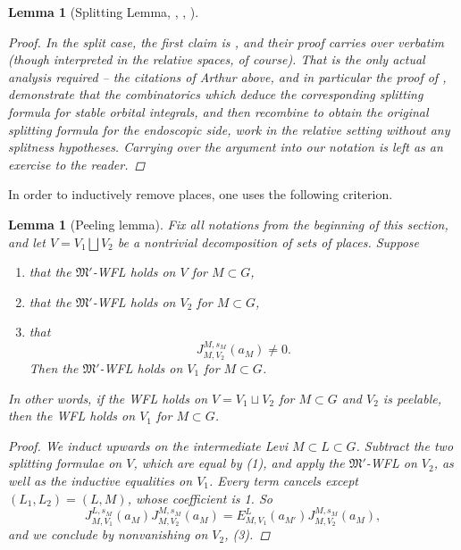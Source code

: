\documentclass[openany]{amsbook}
\newtheorem{lemma}[theorem]{Lemma}
\theoremstyle{definition}
\theoremstyle{remark}
\numberwithin{equation}{section}
\renewcommand{\-}{\operatorname{-}}
\newcommand{\fM}{\mathfrak{M}}
\begin{document}
\begin{lemma}[{Splitting Lemma, \cite{arthurinvlocal}, \cite{arthurtransferwoi}, \cite[Proposition 16.4.1,17.4.1]{CLII}}]
\begin{proof}
        In the split case, the first claim is \cite[17.4.1]{CLII}, and their proof carries over verbatim (though interpreted in the relative spaces, of course). That is the only actual analysis required -- the citations of Arthur above, and in particular the proof of \cite[Theorem 6.1]{arthurtransferwoi}, demonstrate that the combinatorics which deduce the corresponding splitting formula for stable orbital integrals, and then recombine to obtain the original splitting formula for the endoscopic side, work in the relative setting without any splitness hypotheses. Carrying over the argument into our notation is left as an exercise to the reader.
    \end{proof}
\end{lemma}

In order to inductively remove places, one uses the following criterion.

\begin{lemma}[Peeling lemma]\label{lem.peeling}
    Fix all notations from the beginning of this section, and let $V = V_1 \bigsqcup V_2$ be a nontrivial decomposition of sets of places. Suppose
    \begin{enumerate}
        \item that the $\fM'$-WFL holds on $V$ for $M \subset G$,
        \item that the $\fM'$-WFL holds on $V_2$ for $M \subset G$,
        \item that
        $$
            J_{M, V_2}^{M, s_M}(a_M) \neq 0.
        $$
        Then the $\fM'$-WFL holds on $V_1$ for $M \subset G$.
    \end{enumerate}
    In other words, if the WFL holds on $V = V_1 \sqcup V_2$ for $M \subset G$ and $V_2$ is peelable, then the WFL holds on $V_1$ for $M \subset G$. 
    \begin{proof}
        We induct upwards on the intermediate Levi $M \subset L \subset G$. Subtract the two splitting formulae on $V$, which are equal by (1), and apply the $\fM'$-WFL on $V_2$, as well as the inductive equalities on $V_1$. Every term cancels except $(L_1, L_2) = (L,M)$, whose coefficient is 1. So
        $$
            J_{M, V_1}^{L, s_M}(a_M) J_{M, V_2}^{M, s_M}(a_M) = E_{M,{V_1}}^{L}(a_{M'}) J_{M, V_2}^{M, s_M}(a_M),
        $$
        and we conclude by nonvanishing on $V_2$, (3).
    \end{proof}
\end{lemma}
\end{document}
